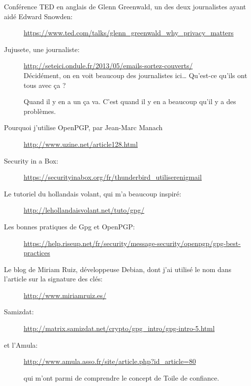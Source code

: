 \documentclass[10pt,a4paper,openany]{book}
\begin{document}
	\begin{description}
		\item[Conférence TED en anglais de Glenn Greenwald, un des deux journalistes ayant aidé Edward Snowden:] \url{https://www.ted.com/talks/glenn_greenwald_why_privacy_matters}
			
		\item[Jujusete, une journaliste:]\url{http://seteici.ondule.fr/2013/05/emails-sortez-couverts/}\\
		
			
		Décidément, on en voit beaucoup des journalistes ici\ldots{} Qu'est-ce qu'ils ont tous avec ça ?
		
		
		\begin{quoting}	
		Quand il y en a un ça va. C'est quand il y en a beaucoup qu'il y a des problèmes.
		\end{quoting}

			
		
		\item[Pourquoi j’utilise OpenPGP, par Jean-Marc Manach] \url{http://www.uzine.net/article128.html}
		
		\item[Security in a Box:]\url{https://securityinabox.org/fr/thunderbird_utiliserenigmail}
		
		\item[Le tutoriel du hollandais volant, qui m'a beaucoup inspiré:]\url{http://lehollandaisvolant.net/tuto/gpg/}
		
		\item[Les bonnes pratiques de Gpg et OpenPGP:]\url{https://help.riseup.net/fr/security/message-security/openpgp/gpg-best-practices}
		
		\item[Le blog de Miriam Ruiz, développeuse Debian, dont j'ai utilisé le nom dans l'article sur la signature des clés:]\url{http://www.miriamruiz.es/}\\
		
		
		
		\item[Samizdat:]\url{http://matrix.samizdat.net/crypto/gpg_intro/gpg-intro-5.html}
		
		\item[et l'Amula:]\url{http://www.amula.asso.fr/site/article.php?id_article=80}
		
		qui m'ont parmi de comprendre le concept de Toile de confiance.		
	\end{description}

	
	
	
\end{document}
